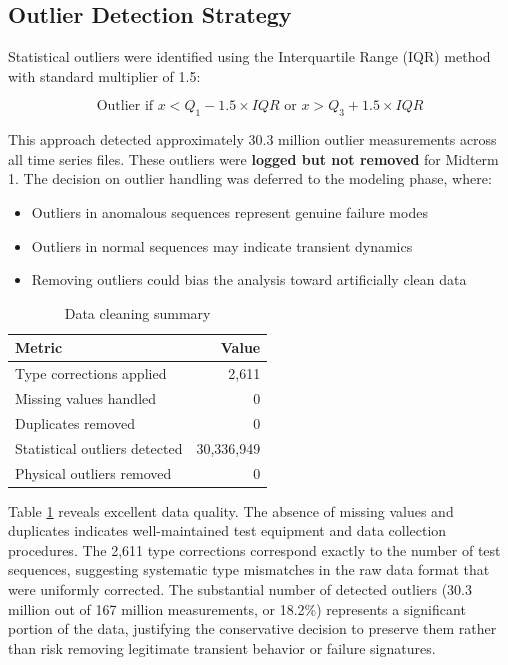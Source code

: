 \documentclass[12pt,a4paper]{article}
\begin{document}
\subsection{Outlier Detection Strategy}

Statistical outliers were identified using the Interquartile Range (IQR) method with standard multiplier of 1.5:

\begin{equation}
\text{Outlier if } x < Q_1 - 1.5 \times IQR \text{ or } x > Q_3 + 1.5 \times IQR
\end{equation}

This approach detected approximately 30.3 million outlier measurements across all time series files. These outliers were \textbf{logged but not removed} for Midterm 1. The decision on outlier handling was deferred to the modeling phase, where:

\begin{itemize}
    \item Outliers in anomalous sequences represent genuine failure modes
    \item Outliers in normal sequences may indicate transient dynamics
    \item Removing outliers could bias the analysis toward artificially clean data
\end{itemize}

\begin{table}[H]
\centering
\caption{Data cleaning summary}
\label{tab:cleaning_summary}
\begin{tabular}{lr}
\toprule
\textbf{Metric} & \textbf{Value} \\
\midrule
Type corrections applied & 2,611 \\
Missing values handled & 0 \\
Duplicates removed & 0 \\
Statistical outliers detected & 30,336,949 \\
Physical outliers removed & 0 \\
\bottomrule
\end{tabular}
\end{table}

Table \ref{tab:cleaning_summary} reveals excellent data quality. The absence of missing values and duplicates indicates well-maintained test equipment and data collection procedures. The 2,611 type corrections correspond exactly to the number of test sequences, suggesting systematic type mismatches in the raw data format that were uniformly corrected. The substantial number of detected outliers (30.3 million out of 167 million measurements, or 18.2\%) represents a significant portion of the data, justifying the conservative decision to preserve them rather than risk removing legitimate transient behavior or failure signatures.
\end{document}
